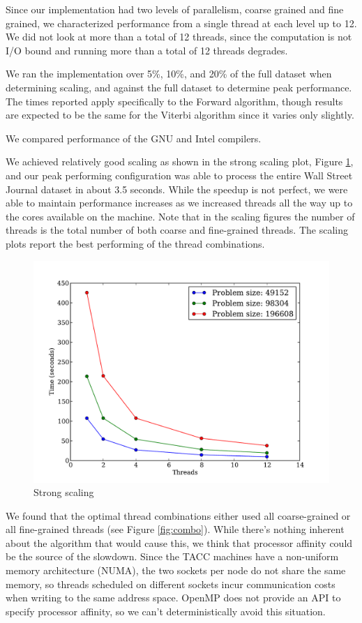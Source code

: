 \documentclass[11pt,onecolumn]{article}
\begin{document}

Since our implementation had two levels of parallelism, coarse grained and fine grained, we characterized performance from a single thread at each level up to 12. We did not look at more than a total of 12 threads, since the computation is not I/O bound and running more than a total of 12 threads degrades.

We ran the implementation over 5\%, 10\%, and 20\% of the full dataset when determining scaling, and against the full dataset to determine peak performance. The times reported apply specifically to the Forward algorithm, though results are expected to be the same for the Viterbi algorithm since it varies only slightly.

We compared performance of the GNU and Intel compilers.


We achieved relatively good scaling as shown in the strong scaling plot, Figure \ref{fig:strong_scaling}, and our peak performing configuration was able to process the entire Wall Street Journal dataset in about 3.5 seconds. While the speedup is not perfect, we were able to maintain performance increases as we increased threads all the way up to the cores available on the machine. Note that in the scaling figures the number of threads is the total number of both coarse and fine-grained threads. The scaling plots report the best performing of the thread combinations.

\begin{figure}[h!]
\centering
\includegraphics[width=.75\linewidth]{figures/intel_strong_scaling}
\caption{Strong scaling}
\label{fig:strong_scaling}
\end{figure}

We found that the optimal thread combinations either used all coarse-grained or all fine-grained threads (see Figure \ref{fig:combo}). While there's nothing inherent about the algorithm that would cause this, we think that processor affinity could be the source of the slowdown. Since the TACC machines have a non-uniform memory architecture (NUMA), the two sockets per node do not share the same memory, so threads scheduled on different sockets incur communication costs when writing to the same address space. OpenMP does not provide an API to specify processor affinity, so we can't deterministically avoid this situation.
\end{document}
